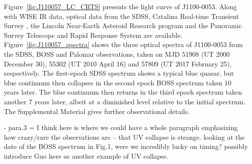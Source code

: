 \documentclass{nature}
\begin{document}
Figure~\ref{fig:J110057_LC_CRTS} presents the light curve of J1100-0053.  Along with WISE IR data, optical data from the SDSS, Catalina Real-time Transient Survey \citep[CRTS;][]{Drake2009, Mahabal2011}, the Lincoln Near-Earth Asteroid Research \citep[LINEAR; ][]{Sesar2011} program and the Panoramic Survey Telescope and Rapid Response System \citep[PanSTARRS;][]{Kaiser2010, Stubbs2010, Tonry2012, Magnier2013} are available. Figure~\ref{fig:J110057_spectra} shows the three optical spectra of J1100-0053 from the SDSS, BOSS and Palomar observations, taken on MJD 51908 (UT 2000 December 30), 55302 (UT 2010 April 16) and 57809 (UT 2017 February 25), respectively.  The first-epoch SDSS spectrum shows a typical blue quasar, but blue continuum then collapses in the second epoch BOSS spectrum taken 10 years later. The blue continuum then returns in the third epoch spectrum taken another 7 years later, albeit at a diminished level relative to the initial spectrum. The Supplemental Material gives further observational details.


- para.3 = I think here is where we could have a whole paragraph emphasizing how crazy/rare the observations are -- that UV collapse is strange.  looking at the date of the BOSS spectrum in Fig.1, were we incredibly lucky on timing?  possibly introduce Guo here as another example of UV collapse.
\end{document}
